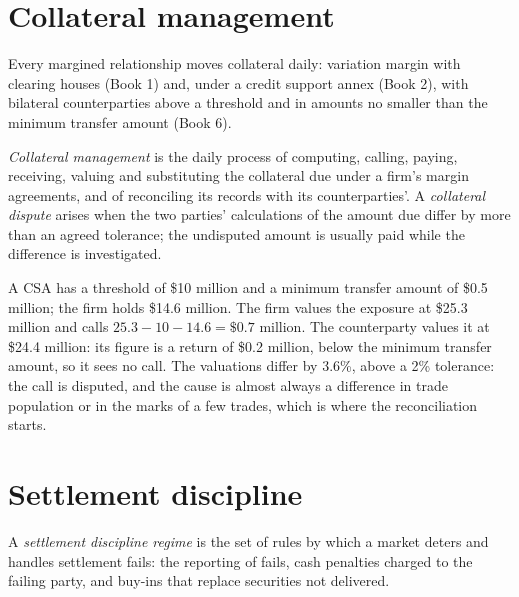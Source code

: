 \section{Collateral management}

Every margined relationship moves collateral daily: variation margin with clearing houses (Book 1) and, under a credit support annex (Book 2), with
bilateral counterparties above a threshold and in amounts no smaller than the minimum transfer amount (Book 6).

\begin{definition}\label{def:fm:operations:collateral}
\emph{Collateral management} is the daily process of computing, calling, paying, receiving, valuing and substituting
the collateral due under a firm's margin agreements, and of reconciling its records with its counterparties'. A \emph{collateral
dispute} arises when the two parties' calculations of the amount due differ by more than an agreed tolerance; the
undisputed amount is usually paid while the difference is investigated.
\end{definition}

\begin{example}\label{ex:fm:operations:call}
A CSA has a threshold of \$10 million and a minimum transfer amount of \$0.5 million; the firm holds \$14.6 million. The firm values the exposure
at \$25.3 million and calls $25.3-10-14.6=\$0.7$ million. The counterparty values it at \$24.4 million: its figure is a return of \$0.2 million,
below the minimum transfer amount, so it sees no call. The valuations differ by 3.6\%, above a 2\% tolerance: the call is disputed, and the cause
is almost always a difference in trade population or in the marks of a few trades, which is where the reconciliation starts.
\end{example}

\label{lst:fm:operations:csa}

\section{Settlement discipline}

\begin{definition}\label{def:fm:operations:discipline}
A \emph{settlement discipline regime} is the set of rules by which a market deters and handles settlement fails:
the reporting of fails, cash penalties charged to the failing party, and buy-ins that replace securities not delivered.
\end{definition}

